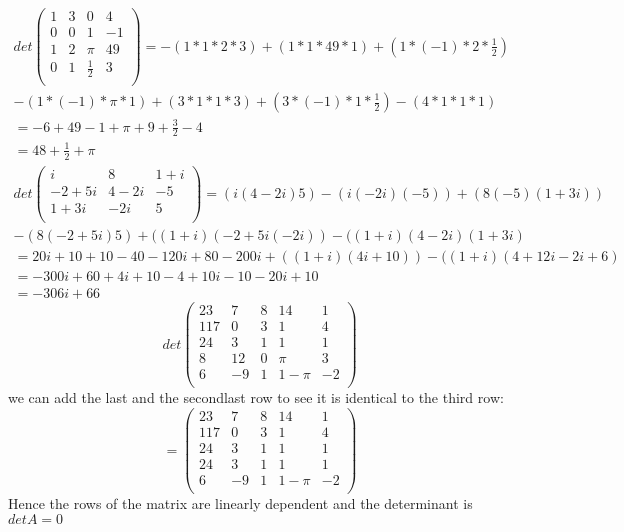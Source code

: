 \documentclass[a4paper,10pt]{article}
\begin{document}
\subsection{}
\label{sec:four}
\begin{multline*}
	det \begin{pmatrix}
	1&3&0&4\\
	0&0&1&-1\\
	1&2&\pi&49\\
	0&1& \frac{1}{2}&3\\
\end{pmatrix}=-(1*1*2*3)+(1*1*49*1)+(1*(-1)*2*\frac{1}{2})\\-(1*(-1)*\pi*1)+(3*1*1*3)+(3*(-1)*1*\frac{1}{2})-(4*1*1*1)\\
	= -6+49-1+\pi+9+\frac{3}{2}-4\\
	=48 +\frac{1}{2} +\pi
\end{multline*}
\begin{multline*}
det \begin{pmatrix}
i & 8 &1+i\\
-2+5i&4-2i&-5\\
1+3i&-2i&5\\
\end{pmatrix}=(i(4-2i)5)-(i(-2i)(-5))+(8(-5)(1+3i))\\-(8(-2+5i)5)+( ( 1+i)(-2+5i(-2i))-( (1+i)(4-2i)(1+3i)
	\end{multline*}
	\begin{multline*}
		= 20i+10+10-40-120i+80-200i+(( 1+i)(4i+10) )-( (1+i)(4+12i-2i+6)\\
		=-300i+60+4i+10-4+10i-10-20i+10\\
		=-306i+66
	\end{multline*}
	\begin{equation*}
		det \begin{pmatrix}
		23&7&8&14&1\\
		117&0&3&1&4\\
		24&3&1&1&1\\
		8&12&0&\pi&3\\
		6&-9&1&1-\pi&-2\\
\end{pmatrix}\end{equation*}
we can add the last and the secondlast row to see it is identical to the third row:
\begin{equation*}
	=	\begin{pmatrix}
		23&7&8&14&1\\
		117&0&3&1&4\\
		24&3&1&1&1\\
		24&3&1&1&1\\
		6&-9&1&1-\pi&-2\\
		\end{pmatrix}
\end{equation*}
Hence the rows of the matrix are linearly dependent and the determinant is $ det A= 0$
\end{document}

